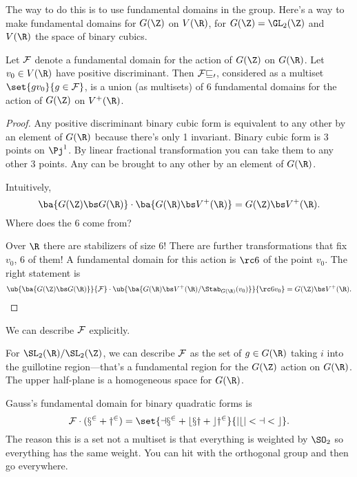 The way to do this is to use fundamental domains in the group. Here's a way to make fundamental domains for $G(\Z)$ on $V(\R)$, for $G(\Z)=\GL_2(\Z)$ and $V(\R)$ the space of binary cubics.

Let $\cal F$ denote a fundamental domain for the action of $G(\Z)$ on $G(\R)$. Let $v_0\in V(\R)$ have positive discriminant. Then $\cal Fv_0$, considered as a multiset $\set{gv_0}{g\in \cal F}$, is a union (as multisets) of 6 fundamental domains for the action of $G(\Z)$ on $V^+(\R)$. 
\begin{proof}
Any positive discriminant binary cubic form is equivalent to any other by an element of $G(\R)$ because there's only 1 invariant. Binary cubic form is 3 points on $\Pj^1$. By linear fractional transformation you can take them to any other 3 points. Any can be brought to any other by an element of $G(\R)$.

Intuitively,
\[
\ba{G(\Z)\bs G(\R)}%
 \cdot \ba{G(\R)\bs V^+(\R)}%
 =G(\Z)\bs V^+(\R).
\]
Where does the 6 come from? 

Over $\R$ there are stabilizers of size 6! There are further transformations that fix $v_0$, 6 of them! A fundamental domain for this action is $\rc6$ of the point $v_0$. The right statement is
\[
\ub{\ba{G(\Z)\bs G(\R)} }{\cal F}\cdot \ub{\ba{G(\R)\bs V^+(\R)/\Stab_{G(\R)}(v_0)}}{\rc 6v_0} =G(\Z)\bs V^+(\R).
\]
\end{proof}

We can describe $\cal F$ explicitly. %

For $\SL_2(\R)/\SL_2(\Z)$, we can describe $\cal F$ as the set of $g\in G(\R)$ taking $i$  
into the guillotine region---that's a fundamental region for the  $G(\Z)$ action on $G(\R)$. The upper half-plane is a homogeneous space for $G(\R)$.

Gauss's fundamental domain for binary quadratic forms is
\[
\cal F \cdot (x^2+y^2)= \set{ax^2 + bxy + cy^2}{|b|<a<c}.
\]
The reason this is a set not a multiset is that everything is weighted by $\SO_2$ so everything has the same weight. You can hit with the orthogonal group and then go everywhere.

